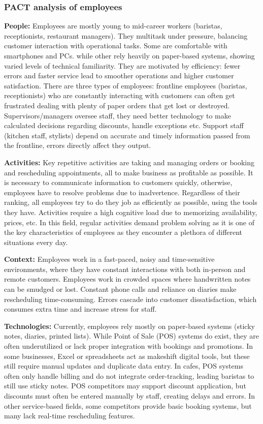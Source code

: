 \documentclass[]{VUMIFTemplateClass}
\begin{document}
\subsubsection{PACT analysis of employees}
    \textbf{People:} Employees are mostly young to mid-career workers (baristas, receptionists, restaurant managers). They multitask under pressure, balancing customer interaction with operational tasks. Some are comfortable with smartphones and PCs. while other rely heavily on paper-based systems, showing varied levels of technical familiarity. They are motivated by efficiency: fewer errors and faster service lead to smoother operations and higher customer satisfaction. There are three types of employees: frontline employees (baristas, receptionists) who are constantly interacting with customers can often get frustrated dealing with plenty of paper orders that get lost or destroyed. Supervisors/managers oversee staff, they need better technology to make calculated decisions regarding discounts, handle exceptions etc. Support staff (kitchen staff, stylists) depend on accurate and timely information passed from the frontline, errors directly affect they output.
    

    \textbf{Activities:} Key repetitive activities are taking and managing orders or 
    booking and rescheduling appointments, all to make business as profitable as possible. It is necessary to communicate information to customers quickly, otherwise, employees have
    to resolve problems due to inadvertence. Regardless of their ranking, all employees try to do they job as efficiently as possible, using the tools they have. Activities require a high cognitive load due to memorizing availability, prices, etc. In this field, regular activities demand problem solving as it is one of the key characteristics of employees as they encounter a plethora of different situations every day.

    
    \textbf{Context:} Employees work in a fast-paced, noisy and time-sensitive
environments, where they have constant interactions with both in-person and remote customers. Employees work in crowded spaces where handwritten notes can be smudged or lost. Constant phone calls and reliance on diaries make rescheduling time-consuming. Errors cascade into customer dissatisfaction, which consumes extra time and increase stress for staff.
    
    \textbf{Technologies:} Currently, employees rely mostly on paper-based systems (sticky notes, diaries, printed lists). While Point of Sale (POS) systems do exist, they are often underutilized or lack proper integration with bookings and promotions. In some businesses, Excel or spreadsheets act as makeshift digital tools, but these still require manual updates and duplicate data entry. In cafes, POS systems often only handle billing and do not integrate order-tracking, leading baristas to still use sticky notes. POS competitors may support discount application, but discounts must often be entered manually by staff, creating delays and errors. In other service-based fields, some competitors provide basic booking systems, but many lack real-time rescheduling features. 
\end{document}
